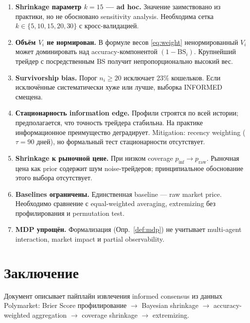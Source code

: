 \documentclass[a4paper, 11pt]{article}
\newcommand{\bs}{\mathrm{BS}}
\begin{document}
\begin{enumerate}
  \item \textbf{Shrinkage параметр $k = 15$ --- ad hoc.}
    Значение заимствовано из практики, но не обосновано
    sensitivity analysis. Необходима сетка $k \in \{5, 10, 15, 20, 30\}$
    с кросс-валидацией.

  \item \textbf{Объём $V_i$ не нормирован.}
    В формуле весов \eqref{eq:weight} ненормированный $V_i$
    может доминировать над accuracy-компонентой $(1 - \bs_i)$.
    Крупнейший трейдер с посредственным $\bs$ получит
    непропорционально высокий вес.

  \item \textbf{Survivorship bias.}
    Порог $n_i \geq 20$ исключает 23\% кошельков.
    Если исключённые систематически хуже или лучше,
    выборка INFORMED смещена.

  \item \textbf{Стационарность information edge.}
    Профили строятся по всей истории; предполагается,
    что точность трейдера стабильна. На практике
    информационное преимущество деградирует.
    Mitigation: recency weighting ($\tau = 90$ дней),
    но формальный тест стационарности отсутствует.

  \item \textbf{Shrinkage к рыночной цене.}
    При низком coverage $p_{\mathrm{inf}} \to p_{\mathrm{raw}}$.
    Рыночная цена как prior содержит шум noise-трейдеров;
    принципиальное обоснование этого выбора отсутствует.

  \item \textbf{Baselines ограничены.}
    Единственная baseline --- raw market price.
    Необходимо сравнение с equal-weighted averaging,
    extremizing без профилирования и permutation test.

  \item \textbf{MDP упрощён.}
    Формализация (Опр.~\ref{def:mdp}) не учитывает
    multi-agent interaction, market impact и partial observability.
\end{enumerate}

\section{Заключение}
\label{sec:conclusion}

Документ описывает пайплайн извлечения informed consensus
из данных Polymarket: Brier Score профилирование $\to$
Bayesian shrinkage $\to$ accuracy-weighted aggregation $\to$
coverage shrinkage $\to$ extremizing.
\end{document}
